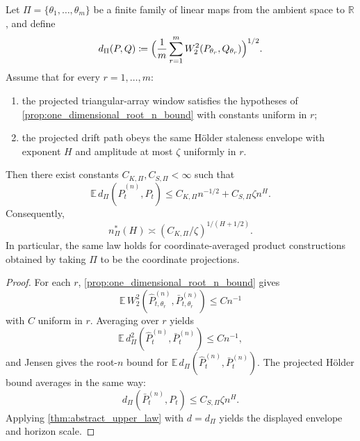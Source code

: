 \begin{corollary}\label{cor:finite_projection_transfer}
Let $\Pi=\{\theta_1,\dots,\theta_m\}$ be a finite family of linear maps from the
ambient space to $\mathbb R$, and define
\[
  d_{\Pi}(P,Q)
  \coloneqq
  \Bigl(\frac{1}{m}\sum_{r=1}^m
  W_2^2\!\left(P_{\theta_r},Q_{\theta_r}\right)\Bigr)^{1/2}.
\]
Assume that for every $r=1,\dots,m$:
\begin{enumerate}[label=(\roman*)]
  \item the projected triangular-array window satisfies the hypotheses of
  \cref{prop:one_dimensional_root_n_bound} with constants uniform in $r$;
  \item the projected drift path obeys the same H\"older staleness envelope with
  exponent $H$ and amplitude at most $\zeta$ uniformly in $r$.
\end{enumerate}
Then there exist constants $C_{K,\Pi},C_{S,\Pi}<\infty$ such that
\[
  \mathbb E\,d_{\Pi}\!\left(\widehat P_t^{(n)},P_t\right)
  \le C_{K,\Pi} n^{-1/2} + C_{S,\Pi}\zeta n^H.
\]
Consequently,
\[
  n_{\Pi}^*(H)\asymp (C_{K,\Pi}/\zeta)^{1/(H+1/2)}.
\]
In particular, the same law holds for coordinate-averaged product
constructions obtained by taking $\Pi$ to be the coordinate projections.
\end{corollary}

\begin{proof}
For each $r$, \cref{prop:one_dimensional_root_n_bound} gives
\[
  \mathbb E\,W_2^2\!\left(\widehat P_{t,\theta_r}^{(n)},\bar P_{t,\theta_r}^{(n)}\right)
  \le C n^{-1}
\]
with $C$ uniform in $r$. Averaging over $r$ yields
\[
  \mathbb E\,d_{\Pi}^2\!\left(\widehat P_t^{(n)},\bar P_t^{(n)}\right)
  \le C n^{-1},
\]
and Jensen gives the root-$n$ bound for
$\mathbb E\,d_{\Pi}(\widehat P_t^{(n)},\bar P_t^{(n)})$. The projected H\"older
bound averages in the same way:
\[
  d_{\Pi}\!\left(\bar P_t^{(n)},P_t\right)
  \le C_{S,\Pi}\zeta n^H.
\]
Applying \cref{thm:abstract_upper_law} with $d=d_{\Pi}$ yields the displayed
envelope and horizon scale.
\end{proof}

